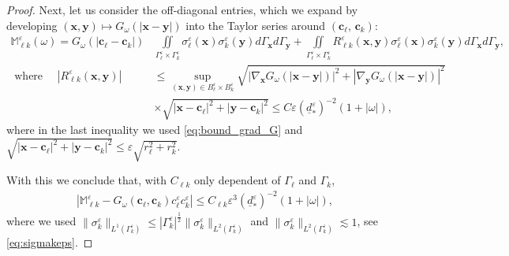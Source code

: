 \documentclass[]{article}
\numberwithin{equation}{section}
\numberwithin{theorem}{section}
\numberwithin{lemma}{section}
\numberwithin{corollary}{section}
\numberwithin{proposition}{section}
\numberwithin{definition}{section}
\newcommand{\bx}{\boldsymbol{x}}
\newcommand{\by}{\boldsymbol{y}}
\newcommand{\bc}{\boldsymbol{c}}
\newcommand{\re}{\varepsilon}
\renewcommand{\vec}{\boldsymbol}
\begin{document}
\begin{proof}
		Next, let us consider the off-diagonal entries, which we expand by developing $(\bx,\by)\mapsto G_{\omega}(|\bx-\by|)$ into the Taylor series around $(\bc_{\ell}, \, \bc_k):$
		\begin{align*}%
			\mathbb{M}^{\varepsilon}_{\ell k}(\omega) = G_{\omega}(| \bc_{\ell} - \bc_k|) &\iint\limits_{\Gamma_{\ell}^{\varepsilon}\times \Gamma_k^{\varepsilon}} \sigma^{\re}_{\ell}(\bx) \sigma^{\re}_{k}(\by)d\Gamma_{\vec{x}}d\Gamma_{\vec{y}} 
			+\iint\limits_{\Gamma_{\ell}^{\varepsilon}\times \Gamma_k^{\varepsilon}} R^{\varepsilon}_{\ell k}(\vec{x},\vec{y}) \sigma^{\re}_{\ell}(\bx) \sigma^{\re}_{k}(\by) d\Gamma_{\vec{x}}d\Gamma_{\vec{y}},\\
			\text{ where }\quad	|R^{\varepsilon}_{\ell k}(\bx,\by)| &\leq 
			\sup_{(\bx,\by)\in B_{\ell}^{\varepsilon}\times B_{k}^{\varepsilon}} \sqrt{|\nabla_{\vec{x}} G_{\omega}(|\bx-\by|)|^2+|\nabla_{\vec{y}} G_{\omega}(|\bx-\by|)|^2} \\ 
			&\times \sqrt{| \vec{x}-\vec{c}_{\ell} |^2+| \vec{y}-\vec{c}_{k} |^2} \leq C \re (\underline{d}_*^{\varepsilon})^{-2}(1+|\omega|) ,
		\end{align*}
		where in the last inequality we used \eqref{eq:bound_grad_G} and $\sqrt{| \vec{x}-\vec{c}_{\ell} |^2+| \vec{y}-\vec{c}_{k} |^2}  \leq \re \sqrt{r_{\ell}^2 + r_{k}^2}$.
		
		With this we conclude that, with $C_{\ell k}$ only dependent of $\Gamma_{\ell}$ and $\Gamma_k$,  
		\begin{align}
			\label{eq:MeG}
			|\mathbb{M}^{\varepsilon}_{\ell k}-G_{\omega}(\bc_{\ell}, \bc_{k})c_{\ell}^{\varepsilon}c_k^{\varepsilon}|
			\leq C_{\ell k} \re^3 (\underline{d}^{\re}_*)^{-2} (1+|\omega|),
		\end{align}
		where we used $\|\sigma_k^{\varepsilon}\|_{L^1(\Gamma_k^{\varepsilon})}\leq |\Gamma_k^{\varepsilon}|^{\frac{1}{2}}\|\sigma_k^{\varepsilon}\|_{L^2(\Gamma_k^{\varepsilon})}$ and $\|\sigma_k^{\varepsilon}\|_{L^2(\Gamma_k^{\varepsilon})}\lesssim 1$, see \eqref{eq:sigmakeps}. 
		

\end{proof}
\end{document}
